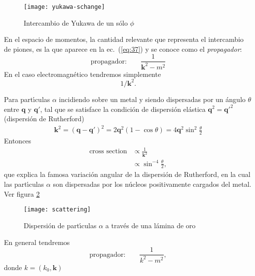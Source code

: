 \begin{frame}
\begin{figure} %

\texttt{[image: yukawa-schange]} %
  \caption{Intercambio de Yukawa de un s\'olo $\phi$} %
\label{fig:n-p} %
\end{figure} %


En el espacio de momentos, la cantidad relevante que representa el
intercambio de piones, es la que aparece en la ec.~(\ref{eq:37}) y se
conoce como el \emph{propagador}:
\begin{equation}
\text{propagador:}\qquad \frac{1}{\mathbf{k}^2-m^2}
\end{equation}
En el caso electromagn\'etico tendremos simplemente
\begin{equation}
  1/\mathbf{k}^2.
\end{equation}
\end{frame}
Para part\'\i culas $\alpha$ incidiendo sobre un metal y siendo dispersadas por un \'angulo $\theta$ entre $\mathbf{q}$ y $\mathbf{q}'$, tal que se satisface la condici\'on de dispersi\'on el\'astica $\mathbf{q}^2={\mathbf{q}'}^2$ (dispersi\'on de Rutherford)
\begin{align}
  \mathbf{k}^2=(\mathbf{q}-\mathbf{q}')^2=2\mathbf{q}^2(1-\cos\theta)=4\mathbf{q}^2\sin^2\frac{\theta}{2}
\end{align}
Entonces
\begin{align}
  \text{cross section}&\propto\frac{1}{\mathbf{k}^2}\nonumber\\
  &\propto\sin^{-4}\frac{\theta}{2},
\end{align}
que explica la famosa variaci\'on angular de la dispersi\'on de Rutherford, en la cual las part\'\i culas $\alpha$ son dispersadas por los n\'ucleos positivamente cargados del metal. Ver figura \ref{fig:sr}

\begin{figure} %
\texttt{[image: scattering]} %
  \caption{Dispersi\'on de part\'\i culas $\alpha$ a trav\'es de una l\'amina de oro} %
  \label{fig:sr} %
\end{figure} 

 
En general tendremos
\begin{equation}
\text{propagador:}\qquad \frac{1}{k^2-m^2},
\end{equation}
donde $k=(k_0,\mathbf{k})$




